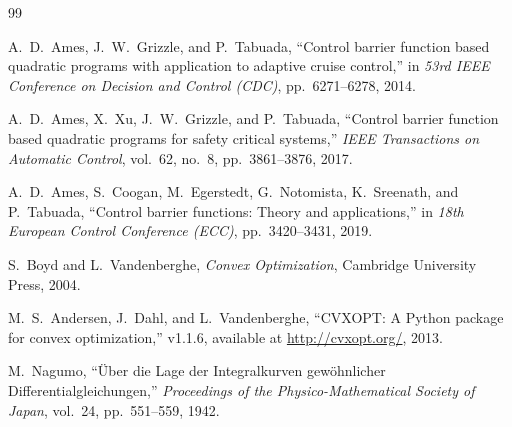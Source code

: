 \documentclass[11pt,a4paper]{article}
\begin{document}
\begin{thebibliography}{99}

A.~D.~Ames, J.~W.~Grizzle, and P.~Tabuada,
``Control barrier function based quadratic programs with application to adaptive cruise control,''
in \emph{53rd IEEE Conference on Decision and Control (CDC)}, pp.~6271--6278, 2014.

A.~D.~Ames, X.~Xu, J.~W.~Grizzle, and P.~Tabuada,
``Control barrier function based quadratic programs for safety critical systems,''
\emph{IEEE Transactions on Automatic Control}, vol.~62, no.~8, pp.~3861--3876, 2017.

A.~D.~Ames, S.~Coogan, M.~Egerstedt, G.~Notomista, K.~Sreenath, and P.~Tabuada,
``Control barrier functions: Theory and applications,''
in \emph{18th European Control Conference (ECC)}, pp.~3420--3431, 2019.

S.~Boyd and L.~Vandenberghe,
\emph{Convex Optimization},
Cambridge University Press, 2004.

M.~S.~Andersen, J.~Dahl, and L.~Vandenberghe,
``CVXOPT: A Python package for convex optimization,''
v1.1.6, available at \url{http://cvxopt.org/}, 2013.

M.~Nagumo,
``Über die Lage der Integralkurven gewöhnlicher Differentialgleichungen,''
\emph{Proceedings of the Physico-Mathematical Society of Japan}, vol.~24, pp.~551--559, 1942.

\end{thebibliography}
\end{document}
